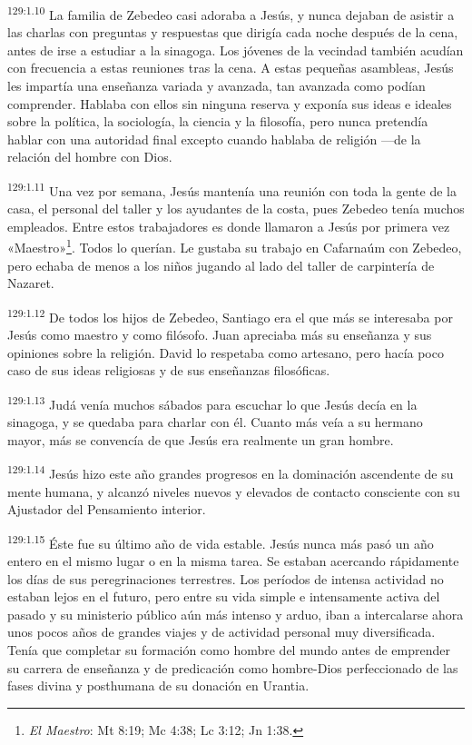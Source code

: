 \par 
\textsuperscript{129:1.10} La familia de Zebedeo casi adoraba a Jesús, y nunca dejaban de asistir a las charlas con preguntas y respuestas que dirigía cada noche después de la cena, antes de irse a estudiar a la sinagoga. Los jóvenes de la vecindad también acudían con frecuencia a estas reuniones tras la cena. A estas pequeñas asambleas, Jesús les impartía una enseñanza variada y avanzada, tan avanzada como podían comprender. Hablaba con ellos sin ninguna reserva y exponía sus ideas e ideales sobre la política, la sociología, la ciencia y la filosofía, pero nunca pretendía hablar con una autoridad final excepto cuando hablaba de religión ---de la relación del hombre con Dios.

\par 
\textsuperscript{129:1.11} Una vez por semana, Jesús mantenía una reunión con toda la gente de la casa, el personal del taller y los ayudantes de la costa, pues Zebedeo tenía muchos empleados. Entre estos trabajadores es donde llamaron a Jesús por primera vez «Maestro»\footnote{\textit{El Maestro}: Mt 8:19; Mc 4:38; Lc 3:12; Jn 1:38.}. Todos lo querían. Le gustaba su trabajo en Cafarnaúm con Zebedeo, pero echaba de menos a los niños jugando al lado del taller de carpintería de Nazaret.

\par 
\textsuperscript{129:1.12} De todos los hijos de Zebedeo, Santiago era el que más se interesaba por Jesús como maestro y como filósofo. Juan apreciaba más su enseñanza y sus opiniones sobre la religión. David lo respetaba como artesano, pero hacía poco caso de sus ideas religiosas y de sus enseñanzas filosóficas.

\par 
\textsuperscript{129:1.13} Judá venía muchos sábados para escuchar lo que Jesús decía en la sinagoga, y se quedaba para charlar con él. Cuanto más veía a su hermano mayor, más se convencía de que Jesús era realmente un gran hombre.

\par 
\textsuperscript{129:1.14} Jesús hizo este año grandes progresos en la dominación ascendente de su mente humana, y alcanzó niveles nuevos y elevados de contacto consciente con su Ajustador del Pensamiento interior.

\par 
\textsuperscript{129:1.15} Éste fue su último año de vida estable. Jesús nunca más pasó un año entero en el mismo lugar o en la misma tarea. Se estaban acercando rápidamente los días de sus peregrinaciones terrestres. Los períodos de intensa actividad no estaban lejos en el futuro, pero entre su vida simple e intensamente activa del pasado y su ministerio público aún más intenso y arduo, iban a intercalarse ahora unos pocos años de grandes viajes y de actividad personal muy diversificada. Tenía que completar su formación como hombre del mundo antes de emprender su carrera de enseñanza y de predicación como hombre-Dios perfeccionado de las fases divina y posthumana de su donación en Urantia.

